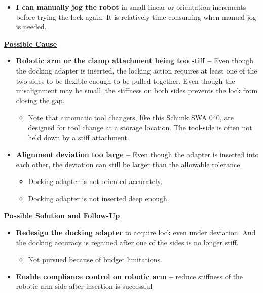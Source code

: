{\begin{itemize}
	\item \textbf{I can manually jog the robot} in small linear or orientation increments before trying the lock again. It is relatively time consuming when manual jog is needed.

\end{itemize}
\textbf{\ul{Possible Cause}}

\begin{itemize}
	\item \textbf{Robotic arm or the clamp attachment being too stiff --} Even though the docking adapter is inserted, the locking action requires at least one of the two sides to be flexible enough to be pulled together. Even though the misalignment may be small, the stiffness on both sides prevents the lock from closing the gap.

\begin{itemize}
	\item Note that automatic tool changers, like this Schunk SWA 040, are designed for tool change at a storage location. The tool-side is often not held down by a stiff attachment.

\end{itemize}
	\item \textbf{Alignment deviation too large --} Even though the adapter is inserted into each other, the deviation can still be larger than the allowable tolerance.

\begin{itemize}
	\item Docking adapter is not oriented accurately.

	\item Docking adapter is not inserted deep enough.

\end{itemize}
\end{itemize}
\textbf{\ul{Possible Solution and Follow-Up}}

\begin{itemize}
	\item \textbf{Redesign the docking adapter} to acquire lock even under deviation. And the docking accuracy is regained after one of the sides is no longer stiff.

\begin{itemize}
	\item Not pursued because of budget limitations.

\end{itemize}
	\item \textbf{Enable compliance control on robotic arm --} reduce stiffness of the robotic arm side after insertion is successful


\end{itemize}}
